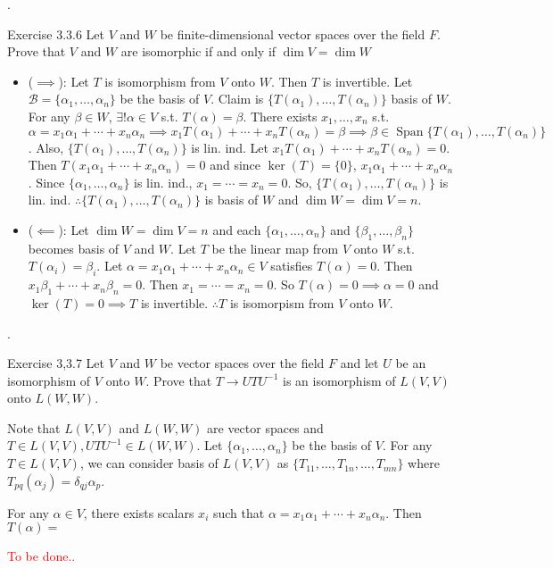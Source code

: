 \documentclass[8pt]{beamer}
\newcommand{\mc}[1]{\mathcal{#1}}
\newcommand{\Span}{\operatorname{Span}}
\begin{document}
\begin{frame}{.}
    \begin{block}{Exercise 3.3.6}
        Let $V$ and $W$ be finite-dimensional vector spaces over the field $F$. Prove that $V$ and $W$ are isomorphic if and only if $\dim V = \dim W$
    \end{block}
    \begin{itemize}
        \item ($\implies$): Let $T$ is isomorphism from $V$ onto $W$.
        Then $T$ is invertible.
        Let $\mc{B} = \{\alpha_1, \dots, \alpha_n\}$ be the basis of $V$.
        Claim is $\{T(\alpha_1), \dots, T(\alpha_n)\}$ basis of $W$.
        For any $\beta \in W$, $\exists! \alpha \in V$ s.t. $T(\alpha) = \beta$.
        There exists $x_1, \dots, x_n$ s.t. $\alpha = x_1 \alpha_1 + \cdots + x_n \alpha_n \implies x_1 T(\alpha_1) + \cdots + x_n T(\alpha_n) = \beta \implies \beta \in \Span \{T(\alpha_1) ,\dots, T(\alpha_n)\}$.
        Also, $\{T(\alpha_1), \dots, T(\alpha_n)\}$ is lin. ind. Let $x_1 T(\alpha_1) + \cdots + x_n T(\alpha_n) = 0$. Then $T(x_1 \alpha_1 + \cdots + x_n \alpha_n) = 0 $ and since $\ker (T) = \{0\}$, $x_1 \alpha_1 + \cdots + x_n \alpha_n$.
        Since $\{\alpha_1, \dots, \alpha_n\}$ is lin. ind., $x_1 = \cdots = x_n = 0$.
        So, $\{T(\alpha_1), \dots, T(\alpha_n)\}$ is lin. ind.
        $\therefore \{T(\alpha_1), \dots, T(\alpha_n)\}$ is basis of $W$ and $\dim W = \dim V = n$.
        \item ($\impliedby$): Let $\dim W = \dim V = n$ and each $\{\alpha_1, \dots, \alpha_n\}$ and $\{\beta_1, \dots, \beta_n\}$ becomes basis of $V$ and $W$. Let $T$ be the linear map from $V$ onto $W$ s.t. $T(\alpha_i) = \beta_i$. Let $\alpha = x_1 \alpha_1 + \cdots + x_n \alpha_n \in V$ satisfies $T(\alpha) = 0$.
        Then $x_1 \beta_1 + \cdots + x_n \beta_n = 0$. Then $x_1 = \cdots = x_n =0 $. So $T(\alpha) = 0 \implies \alpha = 0$ and $\ker (T) = 0 \implies T$ is invertible.
        $\therefore T$ is isomorpism from $V$ onto $W$.
    \end{itemize}
\end{frame}

\begin{frame}{.}
    \begin{block}{Exercise 3,3.7}
        Let $V$ and $W$ be vector spaces over the field $F$ and let $U$ be an isomorphism of $V$ onto $W$.
        Prove that $T \to UT U^{-1}$ is an isomorphism of $L(V,V)$ onto $L(W,W)$.
    \end{block}

    Note that $L(V,V)$ and $L(W,W)$ are vector spaces and $T \in L(V,V), U T U^{-1} \in L(W,W)$.
    Let $\{\alpha_1, \dots, \alpha_n\}$ be the basis of $V$.
    For any $T \in L(V,V)$, we can consider basis of $L(V,V)$ as $\{T_{11}, \dots, T_{1n}, \dots, T_{mn}\}$ where $T_{pq}(\alpha_j) = \delta_{qj} \alpha_p$.

    For any $\alpha \in V$, there exists scalars $x_i$ such that $\alpha = x_1 \alpha_1 + \cdots + x_n \alpha_n$. Then $T(\alpha) = $

    \textcolor{red}{To be done..}
\end{frame}
\end{document}
